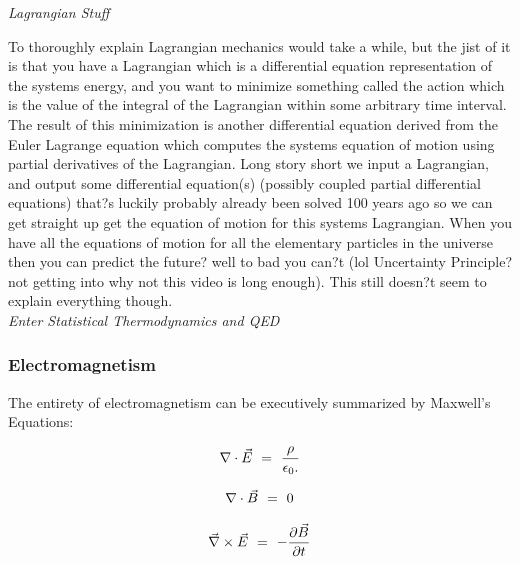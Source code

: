 \documentclass{article}
\begin{document}
\textit{Lagrangian Stuff}

To thoroughly explain Lagrangian mechanics would take a while, but the jist of it is that you have a Lagrangian which is a differential equation representation of the systems energy, and you want to minimize something called the action which is the value of the integral of the Lagrangian within some arbitrary time interval. The result of this minimization is another differential equation derived from the Euler Lagrange equation which computes the systems equation of motion using partial derivatives of the Lagrangian. Long story short we input a Lagrangian, and output some differential equation(s) (possibly coupled partial differential equations) that?s luckily probably already been solved 100 years ago so we can get straight up get the equation of motion for this systems Lagrangian. When you have all the equations of motion for all the elementary particles in the universe then you can predict the future? well to bad you can?t (lol Uncertainty Principle? not getting into why not this video is long enough). This still doesn?t seem to explain everything though. \\

\textit{Enter Statistical Thermodynamics and QED}

\subsubsection{Electromagnetism}\label{sec:electromagnetism}

The entirety of electromagnetism can be executively summarized by Maxwell's Equations:

\begin{equation} \label{eb-eq-1-181}
\nabla\cdot\vec{E} \hspace{0.125cm} = \hspace{0.125cm} \dfrac{\rho}{\epsilon_0.}
\end{equation}

\begin{equation} \label{eb-eq-2-1}
\nabla\cdot\vec{B} \hspace{0.125cm} = \hspace{0.125cm} 0
\end{equation}

\begin{equation} \label{eb-eq-3-1}
\vec{\nabla} \times \vec{E} \hspace{0.125cm} = \hspace{0.125cm} -\frac{\partial{\vec{B}}}{\partial{t}}
\end{equation}
\end{document}
